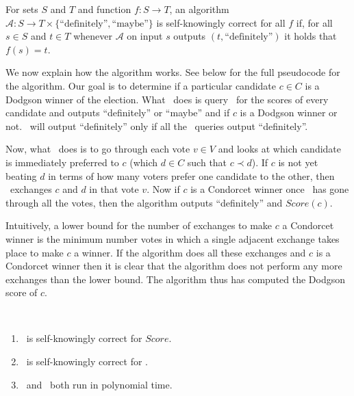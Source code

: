\begin{defn}
	For sets $S$ and $T$ and function $f: S \rightarrow T$,
	an algorithm $\mathcal{A}: S \rightarrow T \times
	\{\text{``definitely''}, \text{``maybe''}\}$ is
	self-knowingly correct for all $f$ if, for all $s \in S$
	and $t \in T$ whenever $\mathcal{A}$ on input $s$ outputs
	$(t, \text{``definitely''})$ it holds that $f(s) = t$.
\end{defn}



We now explain how the algorithm works.
See below for the full pseudocode for the algorithm.
Our goal is to determine if a particular candidate $c \in C$ is
a Dodgson winner of the election.
What \gwin~does is query \gscore~for the scores of every candidate
and outputs ``definitely'' or ``maybe'' and if $c$ is a Dodgson winner or not.
\gwin~will output ``definitely'' only if all the \gscore~queries output
``definitely''.

Now, what \gscore~does is to go through each vote $v \in V$ and looks at
which candidate is immediately preferred to $c$ (which $d\in C$ such that
$c \prec d$).
If $c$ is not yet beating $d$ in terms of how many voters prefer one candidate
to the other, then \gscore~exchanges $c$ and $d$ in that vote $v$.
Now if $c$ is a Condorcet winner once \gscore~has gone through all the votes,
then the algorithm outputs ``definitely'' and $Score(c)$.

Intuitively, a lower bound for the number of exchanges to make $c$ a Condorcet
winner is the minimum number votes in which a single adjacent exchange takes place
to make $c$ a winner.
If the algorithm does all these exchanges and $c$ is a Condorcet winner then
it is clear that the algorithm does not perform any more exchanges than the
lower bound.
The algorithm thus has computed the Dodgson score of $c$.

\begin{theorem} ~
	\begin{enumerate}
		\item \gscore~is self-knowingly correct for $Score$.
		\item \gwin~is self-knowingly correct for \dwin.
		\item \gscore~and \gwin~both run in polynomial time.
	\end{enumerate}
\end{theorem}

